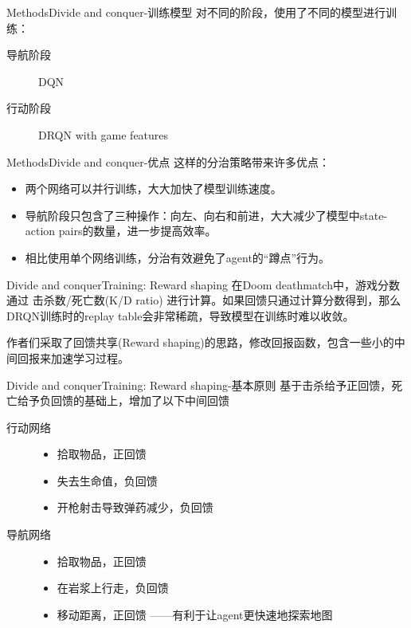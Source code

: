 \documentclass[10pt]{beamer}
\begin{document}
	\begin{frame}{Methods}{Divide and conquer-训练模型}
		对不同的阶段，使用了不同的模型进行训练：
		\begin{description}
			\item[导航阶段] DQN
			\item[行动阶段] DRQN with game features
		\end{description}
		
		
	\end{frame}

	\begin{frame}{Methods}{Divide and conquer-优点}
		这样的分治策略带来许多优点：
		\begin{itemize}
			\item<2-> 两个网络可以并行训练，大大加快了模型训练速度。
			\item<3-> 导航阶段只包含了三种操作：向左、向右和前进，大大减少了模型中state-action pairs的数量，进一步提高效率。
			\item<4-> 相比使用单个网络训练，分治有效避免了agent的“蹲点”行为。
			
		\end{itemize}
	\end{frame}

	\begin{frame}{Divide and conquer}{Training: Reward shaping}
		在Doom deathmatch中，游戏分数通过 击杀数/死亡数(K/D ratio) 进行计算。如果回馈只通过计算分数得到，那么DRQN训练时的replay table会非常稀疏，导致模型在训练时难以收敛。
		
		作者们采取了回馈共享(Reward shaping)的思路，修改回报函数，包含一些小的中间回报来加速学习过程。
		
	\end{frame}

	\begin{frame}{Divide and conquer}{Training: Reward shaping-基本原则}
		基于击杀给予正回馈，死亡给予负回馈的基础上，增加了以下中间回馈
		\begin{description}
			\item[行动网络] 
				\begin{itemize}
					\item 拾取物品，正回馈
					\item 失去生命值，负回馈
					\item 开枪射击导致弹药减少，负回馈
				\end{itemize}
			\item [导航网络]
				\begin{itemize}
					\item 拾取物品，正回馈
					\item 在岩浆上行走，负回馈
					\item 移动距离，正回馈  ——有利于让agent更快速地探索地图
				\end{itemize}
		\end{description}
	\end{frame}
\end{document}
